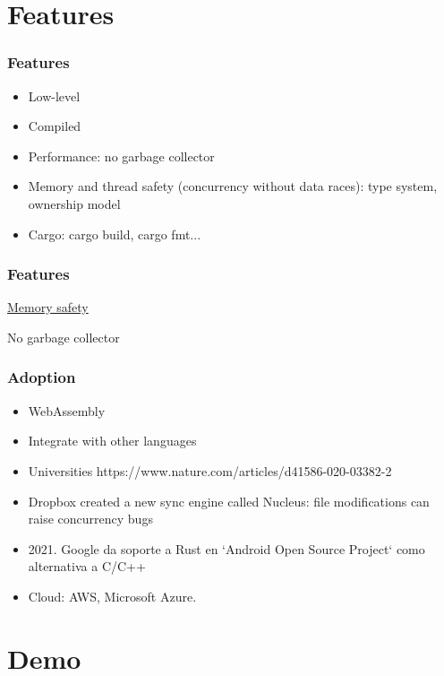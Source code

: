 \documentclass{beamer}
\begin{document}
\section{Features}

\begin{frame}
\frametitle{Features}

\begin{itemize}
\item Low-level
\item Compiled
\item Performance: no garbage collector
\item Memory and thread safety (concurrency without data races): type system, ownership model
\item Cargo: cargo build, cargo fmt...
\end{itemize}

\end{frame}

\begin{frame}
\frametitle{Features}
\underline{Memory safety}

No garbage collector

\end{frame}


\begin{frame}
\frametitle{Adoption}
\begin{itemize}
\item WebAssembly
\item Integrate with other languages
\item Universities https://www.nature.com/articles/d41586-020-03382-2
\item Dropbox created a new sync engine called Nucleus: file modifications can raise concurrency bugs
\item 2021. Google da soporte a Rust en `Android Open Source Project` como alternativa a C/C++
\item Cloud: AWS, Microsoft Azure.
\end{itemize}

\end{frame}

\section{Demo}
\end{document}
